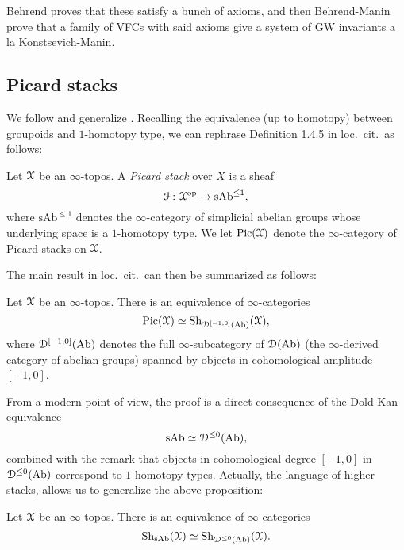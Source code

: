 Behrend proves that these satisfy a bunch of axioms, and then Behrend-Manin prove that a family of VFCs with said axioms
give a system of GW invariants a la Konstsevich-Manin.













\subsection{Picard stacks}

We follow and generalize \cite[Expos\'e XVIII, \S 1.4]{SGA4}.
Recalling the equivalence (up to homotopy) between groupoids and $1$-homotopy type, we can rephrase Definition 1.4.5 in loc.\ cit.\ as follows:

\begin{defin}
	Let $\mathcal X$ be an $\infty$-topos.
	A \emph{Picard stack} over $X$ is a sheaf
	\[ \mathcal F \colon \mathcal X^{\mathrm{op}} \to \mathrm{sAb}^{\le 1} , \]
	where $\mathrm{sAb}^{\le 1}$ denotes the $\infty$-category of simplicial abelian groups whose underlying space is a $1$-homotopy type.
	We let $\mathrm{Pic}(\mathcal X)$ denote the $\infty$-category of Picard stacks on $\mathcal X$.
\end{defin}

The main result in loc.\ cit.\ can then be summarized as follows:

\begin{prop}
	Let $\mathcal X$ be an $\infty$-topos.
	There is an equivalence of $\infty$-categories
	\[ \mathrm{Pic}(\mathcal X) \simeq \mathrm{Sh}_{\mathcal D^{[-1,0]}(\mathrm{Ab})}(\mathcal X) , \]
	where $\mathcal D^{[-1,0]}(\mathrm{Ab})$ denotes the full $\infty$-subcategory of $\mathcal D(\mathrm{Ab})$ (the $\infty$-derived category of abelian groups) spanned by objects in cohomological amplitude $[-1,0]$.
\end{prop}

From a modern point of view, the proof is a direct consequence of the Dold-Kan equivalence
\[ \mathrm{sAb} \simeq \mathcal D^{\le 0}(\mathrm{Ab}) , \]
combined with the remark that objects in cohomological degree $[-1,0]$ in $\mathcal D^{\le 0}(\mathrm{Ab})$ correspond to $1$-homotopy types.
Actually, the language of higher stacks, allows us to generalize the above proposition:

\begin{prop}
	Let $\mathcal X$ be an $\infty$-topos.
	There is an equivalence of $\infty$-categories
	\[ \mathrm{Sh}_{\mathrm{sAb}}(\mathcal X) \simeq \mathrm{Sh}_{\mathcal D^{\le 0}(\mathrm{Ab})}(\mathcal X) . \]
\end{prop}

